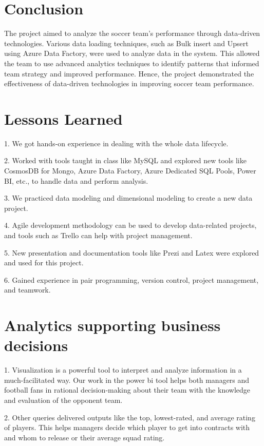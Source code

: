 \documentclass[lettersize]{IEEEtran}
\begin{document}
\section{\textbf{Conclusion}}
The project aimed to analyze the soccer team’s performance through data-driven technologies. Various data loading techniques, such as Bulk insert and Upsert using Azure Data Factory, were used to analyze data in the system. This allowed the team to use advanced analytics techniques to identify patterns that informed team strategy and improved performance. Hence, the project demonstrated the effectiveness of data-driven technologies in improving soccer team performance.

\section{\textbf{Lessons Learned}}
1. We got hands-on experience in dealing with the whole data lifecycle.

2. Worked with tools taught in class like MySQL and explored new tools like CosmosDB for Mongo, Azure Data Factory, Azure Dedicated SQL Pools, Power BI, etc., to handle data and perform analysis.

3. We practiced data modeling and dimensional modeling to create a new data project.

4. Agile development methodology can be used to develop data-related projects, and tools such as Trello can help with project management.

5. New presentation and documentation tools like Prezi and Latex were explored and used for this project.

6. Gained experience in pair programming, version control, project management, and teamwork.

\section{\textbf{Analytics supporting business decisions}}

1. Visualization is a powerful tool to interpret and analyze information in a much-facilitated way. Our work in the power bi tool helps both managers and football fans in rational decision-making about their team with the knowledge and evaluation of the opponent team.  

2. Other queries delivered outputs like the top, lowest-rated, and average rating of players. This helps managers decide which player to get into contracts with and whom to release or their average squad rating.
\end{document}
